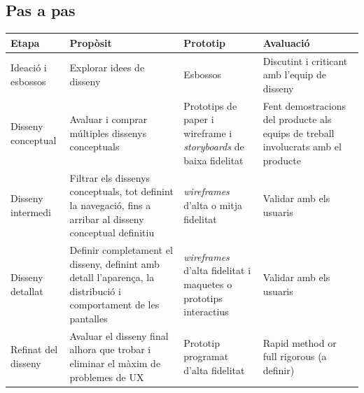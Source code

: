 \subsection{Pas a pas}
\begin{tabular}{ | p{1.8cm} | p{5cm} | p{3cm} | p{3cm} |}
\hline
\textbf{Etapa} & \textbf{Propòsit} & \textbf{Prototip} & \textbf{Avaluació} \\
\hline
Ideació i esbossos & Explorar idees de disseny & Esbossos & Discutint i criticant amb l'equip de disseny \\
\hline
Disseny conceptual & Avaluar i comprar múltiples dissenys conceptuals & Prototips de paper i \gls{wireframe} i \textit{storyboards} de baixa fidelitat &  Fent demostracions del producte als equips de treball involucrats amb el producte\\ 
\hline
Disseny intermedi & Filtrar els dissenys conceptuals, tot definint la navegació, fins a arribar al disseny conceptual definitiu & \textit{wireframes} d'alta o mitja fidelitat & Validar amb els usuaris\\
\hline
Disseny detallat & Definir completament el disseny, definint amb detall l'aparença, la distribució i comportament de les pantalles & \textit{wireframes} d'alta fidelitat i maquetes o prototips interactius & Validar amb els usuaris \\
\hline
Refinat del disseny & Avaluar el disseny final alhora que trobar i eliminar el màxim de problemes de \ac{UX} & Prototip programat d'alta fidelitat& Rapid method or full rigorous (a definir)\\ %
\hline
\end{tabular}